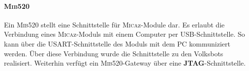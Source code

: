 \paragraph{\textsc{Mib}520}
Ein \textsc{Mib}520 stellt eine Schnittstelle für \textsc{Mica}z-Module dar. Es erlaubt die Verbindung eines \textsc{Mica}z-Moduls mit einem Computer per USB-Schnittstelle. So kann über die USART-Schnittstelle des Moduls mit dem PC kommuniziert werden. Über diese Verbindung wurde die Schnittstelle zu den Volksbots realisiert. Weiterhin verfügt ein \textsc{Mib}520-Gateway über eine \textbf{JTAG}-Schnittstelle.
